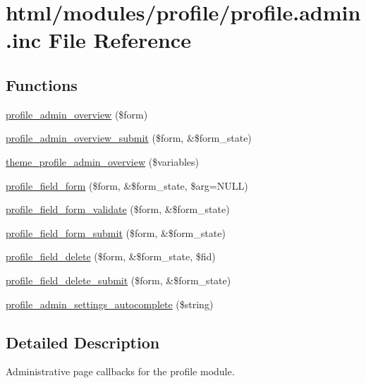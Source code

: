 \hypertarget{profile_8admin_8inc}{
\section{html/modules/profile/profile.admin.inc File Reference}
\label{profile_8admin_8inc}
}
\subsection*{Functions}
\begin{DoxyCompactItemize}
\item 
\hyperlink{group__forms_gafea18af3496251513291ed1ddc563fcc}{profile\_\-admin\_\-overview} (\$form)
\item 
\hyperlink{profile_8admin_8inc_a010af3295f669ceac61a1da0f8d5ad53}{profile\_\-admin\_\-overview\_\-submit} (\$form, \&\$form\_\-state)
\item 
\hyperlink{group__themeable_ga8ae065d1df5f313b0701ec6af07d7b05}{theme\_\-profile\_\-admin\_\-overview} (\$variables)
\item 
\hyperlink{group__forms_ga05b59d1f5368616b5bf775acbb3f87e7}{profile\_\-field\_\-form} (\$form, \&\$form\_\-state, \$arg=NULL)
\item 
\hyperlink{profile_8admin_8inc_a68cc1dfe2c4f0e0946ede9786b4554e2}{profile\_\-field\_\-form\_\-validate} (\$form, \&\$form\_\-state)
\item 
\hyperlink{profile_8admin_8inc_a25efcaa4c4b8e9dc9568622ad0ab3411}{profile\_\-field\_\-form\_\-submit} (\$form, \&\$form\_\-state)
\item 
\hyperlink{profile_8admin_8inc_a2c4b876b5125112271191e78f4816c35}{profile\_\-field\_\-delete} (\$form, \&\$form\_\-state, \$fid)
\item 
\hyperlink{profile_8admin_8inc_a4b5d228dbc4ee4a3091c72b8d4530f38}{profile\_\-field\_\-delete\_\-submit} (\$form, \&\$form\_\-state)
\item 
\hyperlink{profile_8admin_8inc_a2952c7f0dfb428dfdf77d7be37b707ad}{profile\_\-admin\_\-settings\_\-autocomplete} (\$string)
\end{DoxyCompactItemize}


\subsection{Detailed Description}
Administrative page callbacks for the profile module. 

